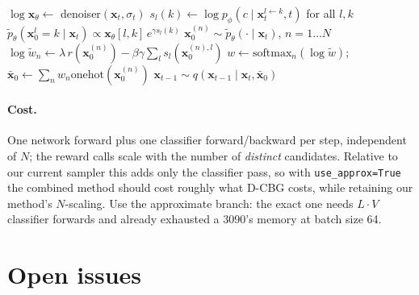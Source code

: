 \documentclass[11pt]{article}
\newcommand{\x}{\mathbf{x}}
\newcommand{\onehot}{\mathrm{onehot}}
\begin{document}
\begin{algorithm}[H]
\caption{One guided denoising step (combined)}
\begin{algorithmic}[1]
\State $\log \x_\theta \gets$ denoiser$(\x_t, \sigma_t)$
\State $s_l(k) \gets \log p_\phi(c \mid \x_t^{l \leftarrow k}, t)$ for all $l, k$
\State $\tilde{p}_\theta(\x_0^l{=}k \mid \x_t)
        \propto \x_\theta[l, k]\, e^{\gamma s_l(k)}$
\State $\x_0^{(n)} \sim \tilde{p}_\theta(\cdot \mid \x_t)$, $n = 1 \dots N$
\State $\log \tilde{w}_n \gets \lambda\, r(\x_0^{(n)})
        - \beta\gamma \sum_l s_l(\x_0^{(n),l})$
\State $w \gets \mathrm{softmax}_n(\log \tilde{w})$;\quad
       $\bar{\x}_0 \gets \sum_n w_n \onehot(\x_0^{(n)})$
\State $\x_{t-1} \sim q(\x_{t-1} \mid \x_t, \bar{\x}_0)$
\end{algorithmic}
\end{algorithm}

\paragraph{Cost.} One network forward plus one classifier forward/backward per
step, independent of $N$; the reward calls scale with the number of
\emph{distinct} candidates. Relative to our current sampler this adds only the
classifier pass, so with \texttt{use\_approx=True} the combined method should
cost roughly what D-CBG costs, while retaining our method's $N$-scaling. Use the
approximate branch: the exact one needs $L \cdot V$ classifier forwards and
already exhausted a 3090's memory at batch size 64.

\section{Open issues}
\end{document}
